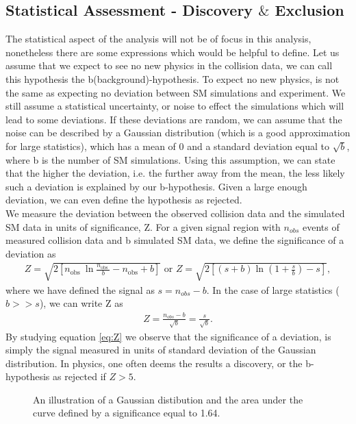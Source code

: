 \subsection{Statistical Assessment - Discovery $\&$ Exclusion}\label{subsec:Sensitivity}
The statistical aspect of the analysis will not be of focus in this analysis, nonetheless there are 
some expressions which would be helpful to define. Let us assume that we expect to see no new physics in the collision
data, we can call this hypothesis the b(background)-hypothesis. To expect no new physics, is not the same as expecting no 
deviation between \ac{SM} simulations and experiment. We still assume a statistical uncertainty, or noise to effect the simulations which 
will lead to some deviations. If these deviations are random, we can assume that the noise can be described by a Gaussian distribution 
(which is a good approximation for large statistics), which has a mean of 0 and a standard deviation equal to $\sqrt{b}$, where b is 
the number of \ac{SM} simulations. Using this assumption, we can state that the higher the deviation, i.e. the further away 
from the mean, the less likely such a deviation is explained by our b-hypothesis. Given a large enough deviation, we can even 
define the hypothesis as rejected.
\\
We measure the deviation between the observed collision data and the simulated \ac{SM} data in units of significance, Z. 
For a given signal region with $n_{obs}$ events of measured collision data and b simulated \ac{SM} data, we define
the significance of a deviation as
\begin{align}\label{eq:Z1}
Z=\sqrt{2\left[n_{\text {obs }} \ln \frac{n_{\text {obs }}}{b}-n_{\mathrm{obs}}+b\right]} \text { or } 
Z=\sqrt{2\left[(s+b) \ln \left(1+\frac{s}{b}\right)-s\right]}, 
\end{align}
where we have defined the signal as $s = n_{obs} - b$. In the case of large statistics ($b>>s$), we can write Z 
as 
\begin{align}\label{eq:Z}
    Z=\frac{n_{o b s}-b}{\sqrt{b}} = \frac{s}{\sqrt{b}}.
\end{align}
By studying equation \ref{eq:Z} we observe that the significance of a deviation, is simply the signal measured in units of standard
deviation of the Gaussian distribution. In physics, one often deems the results a discovery, or the b-hypothesis as rejected if $Z>5$. 
\\
\begin{figure}[H]
    \centering
    \caption{An illustration of a Gaussian distibution and the area under the curve defined by a significance equal to 1.64.}
    \label{fig:ConfInt}
\end{figure}
